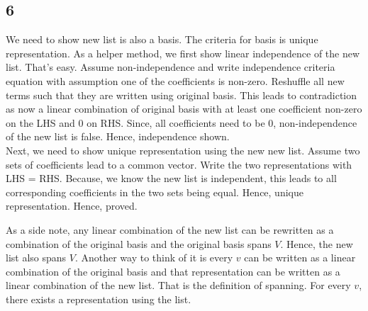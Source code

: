 \documentclass{report}
\begin{document}
\subsection*{6}
We need to show new list is also a basis. The criteria for basis is unique representation. As a helper method, we first show linear independence of the new list. That's easy. Assume non-independence and write independence criteria equation with assumption one of the coefficients is non-zero. Reshuffle all new terms such that they are written using original basis. This leads to contradiction as now a linear combination of original basis with at least one coefficient non-zero on the LHS and 0 on RHS. Since, all coefficients need to be 0, non-independence of the new list is false. Hence, independence shown.\\
Next, we need to show unique representation using the new new list. Assume two sets of coefficients lead to a common vector. Write the two representations with LHS = RHS. Because, we know the new list is independent, this leads to all corresponding coefficients in the two sets being equal. Hence, unique representation. Hence, proved. 

As a side note, any linear combination of the new list can be rewritten as a combination of the original basis and the original basis spans $V$. Hence, the new list also spans $V$. Another way to think of it is every $v$ can be written as a linear combination of the original basis and that representation can be written as a linear combination of the new list. That is the definition of spanning. For every $v$, there exists a representation using the list.
\end{document}
